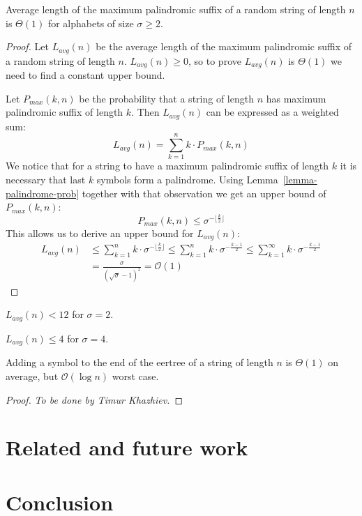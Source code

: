 \begin{theorem}
  Average length of the maximum palindromic suffix
  of a random string of length $n$ is $\Theta(1)$
  for alphabets of size $\sigma \ge 2$.
\end{theorem}
\begin{proof}
  Let $L_{avg}(n)$ be the average length of the maximum palindromic suffix
  of a random string of length $n$.
  $L_{avg}(n) \ge 0$, so to prove $L_{avg}(n)$ is $\Theta(1)$ we need
  to find a constant upper bound.

  Let $P_{max}(k, n)$ be the probability that a string of length $n$
  has maximum palindromic suffix of length $k$.
  Then $L_{avg}(n)$ can be expressed as a weighted sum:
  $$
  L_{avg}(n) = \sum_{k=1}^{n} k \cdot P_{max}(k, n)
  $$
  We notice that for a string to have a maximum palindromic suffix
  of length $k$ it is necessary that last $k$ symbols form a palindrome.
  Using Lemma~\ref{lemma-palindrome-prob} together with that observation
  we get an upper bound of $P_{max}(k, n)$:
  $$
  P_{max}(k, n) \le \sigma^{- \lfloor\frac{k}{2}\rfloor}
  $$
  This allows us to derive an upper bound for $L_{avg}(n)$:
  \begin{align*}
    L_{avg}(n)
      &\le \sum_{k=1}^{n} k \cdot \sigma^{- \lfloor\frac{k}{2}\rfloor}
       \le \sum_{k=1}^{n} k \cdot \sigma^{- \frac{k-1}{2}}
       \le \sum_{k=1}^{\infty} k \cdot \sigma^{- \frac{k-1}{2}} \\
      &= \frac{\sigma}{(\sqrt{\sigma} - 1)^2}
       = \mathcal{O}(1)
  \end{align*}
\end{proof}

\begin{corollary}
  $L_{avg}(n) < 12$ for $\sigma = 2$.
\end{corollary}

\begin{corollary}
  $L_{avg}(n) \le 4$ for $\sigma = 4$.
\end{corollary}

\begin{theorem}
  Adding a symbol to the end of the eertree of
  a string of length $n$ is $\Theta(1)$ on average,
  but $\mathcal{O}(\log{}n)$ worst case.
\end{theorem}
\begin{proof}
  \emph{To be done by Timur Khazhiev.}
\end{proof}

\section{Related and future work}

\section{Conclusion}

